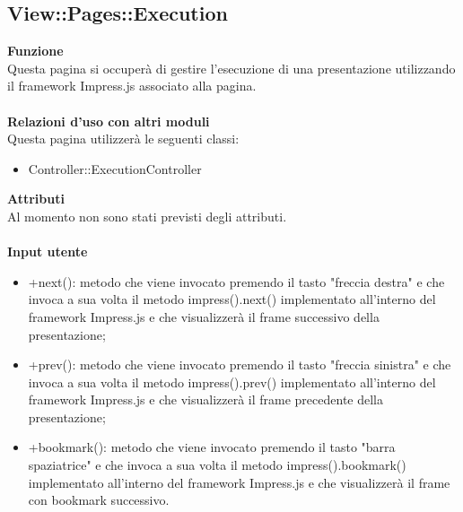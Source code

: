 {\subsection{View::Pages::Execution}{
	\textbf{Funzione}\\
	\indent Questa pagina si occuperà di gestire l'esecuzione di una presentazione utilizzando il framework Impress.js associato alla pagina.\\\\
	\textbf{Relazioni d'uso con altri moduli}\\
	\indent Questa pagina utilizzerà le seguenti classi:
	\begin{itemize}
		\item Controller::ExecutionController
	\end{itemize}
	\textbf{Attributi}\\
	\indent Al momento non sono stati previsti degli attributi.\\\\
	\textbf{Input utente}
	\begin{itemize}
		\item +next(): metodo che viene invocato premendo il tasto "freccia destra" e che invoca a sua volta il metodo impress().next() implementato all'interno del framework Impress.js e che visualizzerà il frame successivo della presentazione;
		\item +prev(): metodo che viene invocato premendo il tasto "freccia sinistra" e che invoca a sua volta il metodo impress().prev() implementato all'interno del framework Impress.js e che visualizzerà il frame precedente della presentazione;
		\item +bookmark(): metodo che viene invocato premendo il tasto "barra spaziatrice" e che invoca a sua volta il metodo impress().bookmark() implementato all'interno del framework Impress.js e che visualizzerà il frame con bookmark successivo.
	\end{itemize}
}
}
